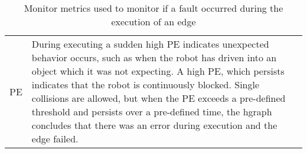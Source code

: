 

\noindent
\begin{table}[H]
\centering
\begin{tabular}%
  {>{\raggedleft\arraybackslash}p{}%
   >{\raggedright\arraybackslash}p{}}
\acf{PE}&  During executing a sudden high \ac{PE} indicates unexpected behavior occurs, such as when the robot has driven into an object which it was not expecting. A high \ac{PE}, which persists indicates that the robot is continuously blocked. Single collisions are allowed, but when the \ac{PE} exceeds a pre-defined threshold and persists over a pre-defined time, the \ac{hgraph} concludes that there was an error during execution and the edge failed.\\
\end{tabular}
\caption{Monitor metrics used to monitor if a fault occurred during the execution of an edge}%
\label{table:monitoring_edge_metrics}
\end{table}
